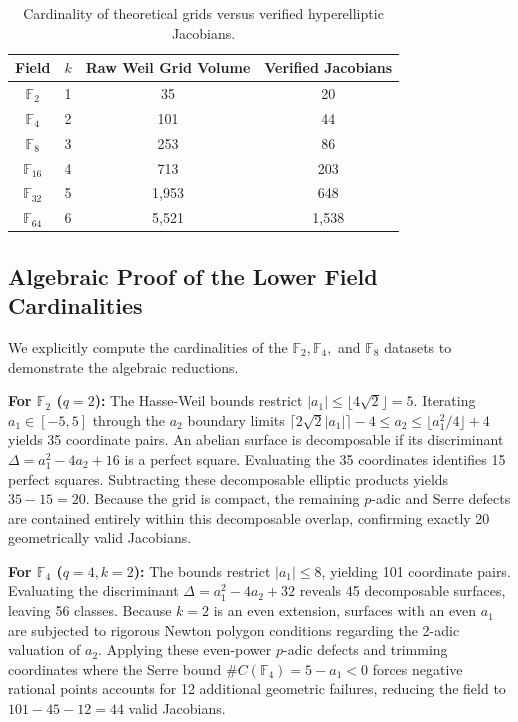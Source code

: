 \documentclass[12pt, letterpaper]{article}
\begin{document}
\begin{table}[h!]
\centering
\begin{tabular}{cccc}
\toprule
Field & $k$ & Raw Weil Grid Volume & Verified Jacobians \\
\midrule
$\mathbb{F}_2$ & 1 & 35 & 20 \\
$\mathbb{F}_4$ & 2 & 101 & 44 \\
$\mathbb{F}_8$ & 3 & 253 & 86 \\
$\mathbb{F}_{16}$ & 4 & 713 & 203 \\
$\mathbb{F}_{32}$ & 5 & 1,953 & 648 \\
$\mathbb{F}_{64}$ & 6 & 5,521 & 1,538 \\
\bottomrule
\end{tabular}
\caption{Cardinality of theoretical grids versus verified hyperelliptic Jacobians.}
\end{table}

\subsection{Algebraic Proof of the Lower Field Cardinalities}
We explicitly compute the cardinalities of the $\mathbb{F}_2, \mathbb{F}_4,$ and $\mathbb{F}_8$ datasets to demonstrate the algebraic reductions.

\textbf{For $\mathbb{F}_2$ ($q=2$):}
The Hasse-Weil bounds restrict $|a_1| \le \lfloor 4\sqrt{2} \rfloor = 5$. Iterating $a_1 \in [-5, 5]$ through the $a_2$ boundary limits $\lceil 2\sqrt{2}|a_1| \rceil - 4 \le a_2 \le \lfloor a_1^2/4 \rfloor + 4$ yields 35 coordinate pairs. An abelian surface is decomposable if its discriminant $\Delta = a_1^2 - 4a_2 + 16$ is a perfect square. Evaluating the 35 coordinates identifies 15 perfect squares. Subtracting these decomposable elliptic products yields $35 - 15 = 20$. Because the grid is compact, the remaining $p$-adic and Serre defects are contained entirely within this decomposable overlap, confirming exactly 20 geometrically valid Jacobians.

\textbf{For $\mathbb{F}_4$ ($q=4, k=2$):}
The bounds restrict $|a_1| \le 8$, yielding 101 coordinate pairs. Evaluating the discriminant $\Delta = a_1^2 - 4a_2 + 32$ reveals 45 decomposable surfaces, leaving 56 classes. Because $k=2$ is an even extension, surfaces with an even $a_1$ are subjected to rigorous Newton polygon conditions regarding the 2-adic valuation of $a_2$. Applying these even-power $p$-adic defects and trimming coordinates where the Serre bound $\#C(\mathbb{F}_4) = 5 - a_1 < 0$ forces negative rational points accounts for 12 additional geometric failures, reducing the field to $101 - 45 - 12 = 44$ valid Jacobians.
\end{document}

